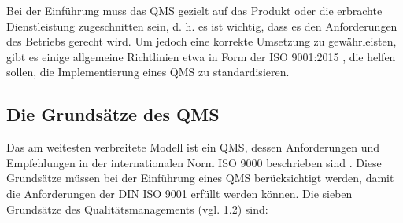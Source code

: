 \documentclass[11pt]{scrartcl}       %
\begin{document}
Bei der Einführung muss das QMS gezielt auf das Produkt oder die erbrachte Dienstleistung zugeschnitten sein, d. h. es ist wichtig, dass es den Anforderungen des Betriebs gerecht wird. Um jedoch eine korrekte Umsetzung zu gewährleisten, gibt es einige allgemeine Richtlinien etwa in Form der ISO 9001:2015 \cite{normungsinstitut2009qualitatsmanagementsysteme}, die helfen sollen, die Implementierung eines QMS zu standardisieren. 

 

\subsection{Die Grundsätze des QMS}

Das am weitesten verbreitete Modell ist ein QMS, dessen Anforderungen
und Empfehlungen in der internationalen Norm ISO 9000 beschrieben sind \cite{Leontyuk_2019}. Diese Grundsätze müssen bei der Einführung eines QMS berücksichtigt werden, damit die Anforderungen der DIN ISO 9001 erfüllt werden können. Die sieben Grundsätze des Qualitätsmanagements (vgl. \cite{brugger2016din} 1.2) sind:
\end{document}
